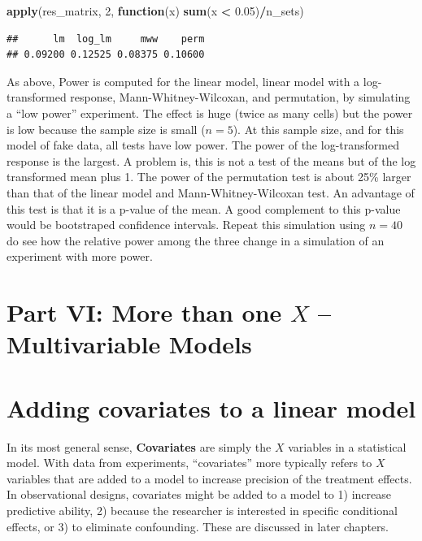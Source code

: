 \documentclass[]{book}
\newenvironment{Shaded}{\begin{snugshade}}{\end{snugshade}}
\newcommand{\ControlFlowTok}[1]{\textcolor[rgb]{0.13,0.29,0.53}{\textbf{#1}}}
\newcommand{\DecValTok}[1]{\textcolor[rgb]{0.00,0.00,0.81}{#1}}
\newcommand{\FloatTok}[1]{\textcolor[rgb]{0.00,0.00,0.81}{#1}}
\newcommand{\KeywordTok}[1]{\textcolor[rgb]{0.13,0.29,0.53}{\textbf{#1}}}
\newcommand{\NormalTok}[1]{#1}
\newcommand{\OperatorTok}[1]{\textcolor[rgb]{0.81,0.36,0.00}{\textbf{#1}}}
\newcommand{\StringTok}[1]{\textcolor[rgb]{0.31,0.60,0.02}{#1}}
\begin{document}
\begin{Shaded}
\begin{Highlighting}[]
\KeywordTok{apply}\NormalTok{(res_matrix, }\DecValTok{2}\NormalTok{, }\ControlFlowTok{function}\NormalTok{(x) }\KeywordTok{sum}\NormalTok{(x }\OperatorTok{<}\StringTok{ }\FloatTok{0.05}\NormalTok{)}\OperatorTok{/}\NormalTok{n_sets)}
\end{Highlighting}
\end{Shaded}

\begin{verbatim}
##      lm  log_lm     mww    perm 
## 0.09200 0.12525 0.08375 0.10600
\end{verbatim}

As above, Power is computed for the linear model, linear model with a log-transformed response, Mann-Whitney-Wilcoxan, and permutation, by simulating a ``low power'' experiment. The effect is huge (twice as many cells) but the power is low because the sample size is small (\(n = 5\)). At this sample size, and for this model of fake data, all tests have low power. The power of the log-transformed response is the largest. A problem is, this is not a test of the means but of the log transformed mean plus 1. The power of the permutation test is about 25\% larger than that of the linear model and Mann-Whitney-Wilcoxan test. An advantage of this test is that it is a p-value of the mean. A good complement to this p-value would be bootstraped confidence intervals. Repeat this simulation using \(n=40\) do see how the relative power among the three change in a simulation of an experiment with more power.

\hypertarget{part-vi-more-than-one-x-multivariable-models}{%
\chapter*{\texorpdfstring{Part VI: More than one \(X\) -- Multivariable Models}{Part VI: More than one X -- Multivariable Models}}\label{part-vi-more-than-one-x-multivariable-models}}

\hypertarget{adding-covariates-to-a-linear-model}{%
\chapter{Adding covariates to a linear model}\label{adding-covariates-to-a-linear-model}}

In its most general sense, \textbf{Covariates} are simply the \(X\) variables in a statistical model. With data from experiments, ``covariates'' more typically refers to \(X\) variables that are added to a model to increase precision of the treatment effects. In observational designs, covariates might be added to a model to 1) increase predictive ability, 2) because the researcher is interested in specific conditional effects, or 3) to eliminate confounding. These are discussed in later chapters.
\end{document}

